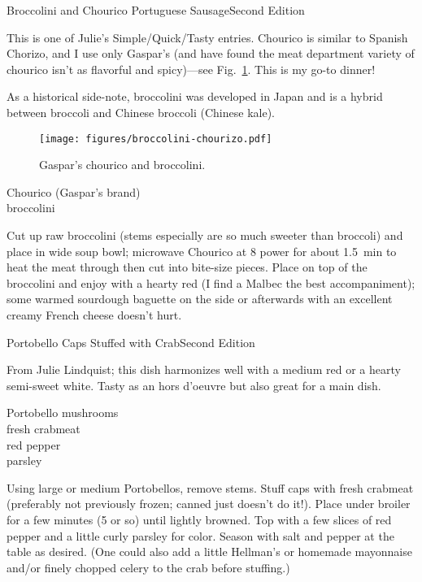 \begin{entry}{Broccolini and Chourico Portuguese Sausage}{Second Edition}

\begin{open}
    This is one of Julie's Simple/Quick/Tasty entries.  Chourico is similar to
    Spanish Chorizo, and I use only Gaspar's (and have found the meat department
    variety of chourico isn't as flavorful and spicy)---see
    Fig.~\ref{fig:chourico}. This is my go-to dinner!

    As a historical side-note, broccolini was developed in Japan and is a hybrid
    between broccoli and Chinese broccoli (Chinese kale).
\end{open}
\begin{figure}
  \centering
  \texttt{[image: figures/broccolini-chourizo.pdf]}
  \caption{Gaspar's chourico and broccolini.}
  \label{fig:chourico}
\end{figure}
\begin{ingredients}
    Chourico (Gaspar's brand)\\
    broccolini
\end{ingredients}
Cut up raw broccolini (stems especially are so much sweeter than broccoli) and
place in wide soup bowl; microwave Chourico at 8 power for about
\SI{1.5}{\minute} to heat the meat through then cut into bite-size pieces.
Place on top of the broccolini and enjoy with a hearty red (I find a Malbec the
best accompaniment); some warmed sourdough baguette on the side or afterwards
with an excellent creamy French cheese doesn't hurt.
\end{entry}

\begin{entry}{Portobello Caps Stuffed with Crab}{Second Edition}

\begin{open}
  From Julie Lindquist; this dish harmonizes well with a medium red or a
  hearty semi-sweet white. Tasty as an hors d'oeuvre but also great for a main
  dish.
\end{open}
\begin{ingredients}
    Portobello mushrooms\\
    fresh crabmeat\\
    red pepper\\
    parsley
\end{ingredients}
Using large or medium Portobellos, remove stems. Stuff caps with fresh
crabmeat (preferably not previously frozen; canned just doesn't do it!). Place
under broiler for a few minutes (5 or so) until lightly browned. Top with a
few slices of red pepper and a little curly parsley for color. Season with
salt and pepper at the table as desired.  (One could also add a little
Hellman's or homemade mayonnaise and/or finely chopped celery to the crab
before stuffing.)
\end{entry}

